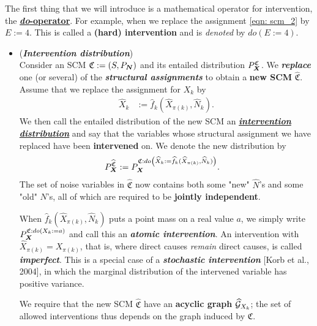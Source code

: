 \documentclass[11pt]{article}
\begin{document}
The first thing that we will introduce is a mathematical operator for intervention, the \underline{\textbf{\emph{do}-operator}}. For example, when we replace the assignment \eqref{eqn: scm_2} by $E := 4$. This is called a \textbf{(hard) intervention} and is \emph{denoted} by $do(E := 4)$.  

\begin{itemize}
\item \begin{definition}  (\textbf{\emph{Intervention distribution}}) \citep{peters2017elements}\\
Consider an SCM $\mathfrak{C} := (S, P_{\boldsymbol{N}})$ and its entailed distribution $P_{\boldsymbol{X}}^{\mathfrak{C}}$. We \textbf{\emph{replace}} one (or several) of the \emph{\textbf{structural assignments}} to obtain a \textbf{new SCM} $\widehat{\mathfrak{C}}$. Assume that we replace the assignment for $X_k$ by
\begin{align*}
\widehat{X}_{k} &:= \widehat{f}_{k}(\widehat{X}_{\pi(k)}, \widehat{N}_k).
\end{align*}
We then call the entailed distribution of the new SCM an \underline{\textbf{\emph{intervention distribution}}} and say that the variables whose structural assignment we have replaced have been \textbf{intervened} on. We denote the new distribution by
\begin{align*}
P_{\boldsymbol{X}}^{\widehat{\mathfrak{C}}} &:=  P_{\boldsymbol{X}}^{\mathfrak{C}: do\left(\widehat{X}_{k} := \widehat{f}_{k}(\widehat{X}_{\pi(k)}, \widehat{N}_k)\right)}.
\end{align*}  The set of noise variables in $\widehat{\mathfrak{C}}$ now contains both some "new" $ \widehat{N}$’s and some "old" $N$’s, all of which are required to be \textbf{jointly independent}.

When $\widehat{f}_{k}(\widehat{X}_{\pi(k)}, \widehat{N}_k)$ puts a point mass on a real value $a$, we simply write  $P_{\boldsymbol{X}}^{\mathfrak{C}: do(X_k := a)}$
and call this an \textbf{\emph{atomic intervention}}. An intervention with $\widehat{X}_{\pi(k)} = X_{\pi(k)}$, that is, where direct causes \emph{remain} direct causes, is called \emph{\textbf{imperfect}}.  This is a special case of a \textbf{\emph{stochastic intervention}} [Korb et al., 2004], in which the marginal distribution of the intervened variable has positive variance. 

We require that the new SCM $\widehat{\mathfrak{C}}$ have an \textbf{acyclic graph} $\widehat{{\mathcal G}}_{X_k}$; the set of allowed interventions thus depends on the graph induced by $\mathfrak{C}$.
\end{definition}
\end{itemize}
\end{document}
